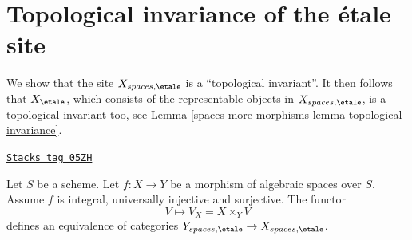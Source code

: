 \section{Topological invariance of the \'etale site}
\label{spaces-more-morphisms-section-topological-invariance}
We show that the site $X_{spaces, \etale}$ is a ``topological
invariant''. It then follows that $X_\etale$, which
consists of the representable objects in $X_{spaces, \etale}$,
is a topological invariant too, see Lemma \ref{spaces-more-morphisms-lemma-topological-invariance}.

\begin{theorem}
\label{spaces-more-morphisms-theorem-topological-invariance}
\href{https://stacks.math.columbia.edu/tag/05ZH}{\texttt{Stacks tag 05ZH}}

Let $S$ be a scheme.
Let $f : X \to Y$ be a morphism of algebraic spaces over $S$.
Assume $f$ is integral, universally injective and surjective.
The functor
$$
V \longmapsto V_X = X \times_Y V
$$
defines an equivalence of categories
$Y_{spaces, \etale} \to X_{spaces, \etale}$.
\end{theorem}

